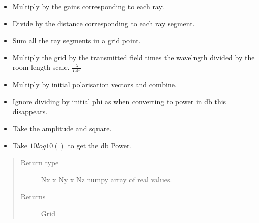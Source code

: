\documentclass[letterpaper,10pt,english]{sphinxmanual}
\begin{document}
\begin{fulllineitems}
\begin{itemize}
\item {} 
Multiply by the gains corresponding to each ray.

\item {} 
Divide by the distance corresponding to each ray segment.

\item {} 
Sum all the ray segments in a grid point.

\item {} 
Multiply the grid by the transmitted field times the wavelngth     divided by the room length scale. \(\frac{\lambda}{L 4 \pi}\)

\item {} 
Multiply by initial polarisation vectors and combine.

\item {} 
Ignore dividing by initial phi as when converting to power in db     this disappears.

\item {} 
Take the amplitude and square.

\item {} 
Take \(10log10()\) to get the db Power.

\end{itemize}
\begin{quote}\begin{description}
\item[{Return type}] \leavevmode
Nx x Ny x Nz numpy array of real values.

\item[{Returns}] \leavevmode
Grid

\end{description}\end{quote}

\end{fulllineitems}

\end{document}
